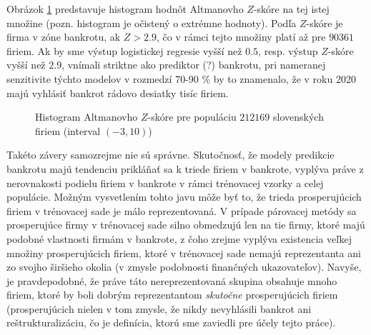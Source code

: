 Obrázok \ref{altman_whole_pop} predstavuje histogram hodnôt Altmanovho \(Z\)-skóre na tej istej množine (pozn. histogram je očistený o extrémne hodnoty).
Podľa \(Z\)-skóre je firma v zóne bankrotu, ak \(Z > 2.9\), čo v rámci tejto množiny platí až pre \(90361\) firiem.
Ak by sme výstup logistickej regresie vyšší než \(0.5\), resp. výstup \(Z\)-skóre vyšší než \(2.9\), vnímali striktne ako prediktor (?) bankrotu,
pri nameranej senzitivite týchto modelov v rozmedzí 70-90 \% by to znamenalo, že v roku 2020 majú vyhlásiť bankrot rádovo desiatky tisíc firiem.

\begin{figure}
\caption{Histogram Altmanovho \(Z\)-skóre pre populáciu \(212169\) slovenských firiem (interval \((-3, 10)\))}
\label{altman_whole_pop}
\end{figure}

Takéto závery samozrejme nie sú správne. Skutočnosť, že modely predikcie bankrotu majú tendenciu prikláňať sa k triede firiem v bankrote,
vyplýva práve z nerovnakosti podielu firiem v bankrote v rámci trénovacej vzorky a celej populácie.
Možným vysvetlením tohto javu môže byť to, že trieda prosperujúcich firiem v trénovacej sade je málo reprezentovaná.
V prípade párovacej metódy sa prosperujúce firmy v trénovacej sade silno obmedzujú len na tie firmy, ktoré majú podobné vlastnosti firmám v bankrote,
z čoho zrejme vyplýva existencia veľkej množiny prosperujúcich firiem, ktoré v trénovacej sade nemajú reprezentanta ani zo svojho širšieho okolia (v zmysle podobnosti finančných ukazovateľov).
Navyše, je pravdepodobné, že práve táto nereprezentovaná skupina obsahuje mnoho firiem, ktoré by boli dobrým reprezentantom \emph{skutočne} prosperujúcich firiem
(prosperujúcich nielen v tom zmysle, že nikdy nevyhlásili bankrot ani reštrukturalizáciu, čo je definícia, ktorú sme zaviedli pre účely tejto práce).

